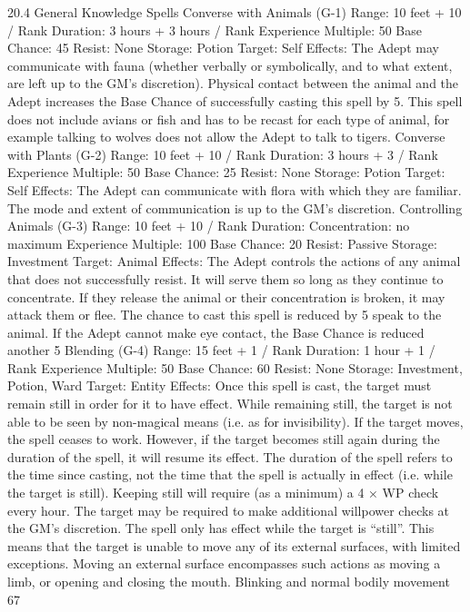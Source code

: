\documentclass[a4paper]{article}
\begin{document}
\begin{multicols}{3}
20.4 General Knowledge Spells
Converse with Animals (G-1)
Range: 10 feet + 10 / Rank
Duration: 3 hours + 3 hours / Rank
Experience Multiple: 50
Base Chance: 45%
Resist: None
Storage: Potion
Target: Self
Effects: The Adept may communicate with fauna
(whether verbally or symbolically, and to what
extent, are left up to the GM’s discretion). Physical
contact between the animal and the Adept increases the Base Chance of successfully casting
this spell by 5. This spell does not include avians
or fish and has to be recast for each type of animal,
for example talking to wolves does not allow the
Adept to talk to tigers.
Converse with Plants (G-2)
Range: 10 feet + 10 / Rank
Duration: 3 hours + 3 / Rank
Experience Multiple: 50
Base Chance: 25%
Resist: None
Storage: Potion
Target: Self
Effects: The Adept can communicate with flora
with which they are familiar. The mode and extent
of communication is up to the GM’s discretion.
Controlling Animals (G-3)
Range: 10 feet + 10 / Rank
Duration: Concentration: no maximum
Experience Multiple: 100
Base Chance: 20%
Resist: Passive
Storage: Investment
Target: Animal
Effects: The Adept controls the actions of any
animal that does not successfully resist. It will
serve them so long as they continue to concentrate.
If they release the animal or their concentration is
broken, it may attack them or flee. The chance to
cast this spell is reduced by 5%
speak to the animal. If the Adept cannot make eye
contact, the Base Chance is reduced another 5%
Blending (G-4)
Range: 15 feet + 1 / Rank
Duration: 1 hour + 1 / Rank
Experience Multiple: 50
Base Chance: 60%
Resist: None
Storage: Investment, Potion, Ward
Target: Entity
Effects: Once this spell is cast, the target must
remain still in order for it to have effect. While
remaining still, the target is not able to be seen by
non-magical means (i.e. as for invisibility). If the
target moves, the spell ceases to work. However, if
the target becomes still again during the duration of
the spell, it will resume its effect. The duration of
the spell refers to the time since casting, not the
time that the spell is actually in effect (i.e. while
the target is still).
Keeping still will require (as a minimum) a 4 × WP
check every hour. The target may be required to
make additional willpower checks at the GM’s
discretion.
The spell only has effect while the target is “still”.
This means that the target is unable to move any of
its external surfaces, with limited exceptions. Moving an external surface encompasses such actions
as moving a limb, or opening and closing the
mouth. Blinking and normal bodily movement
67


\end{multicols}
\end{document}

